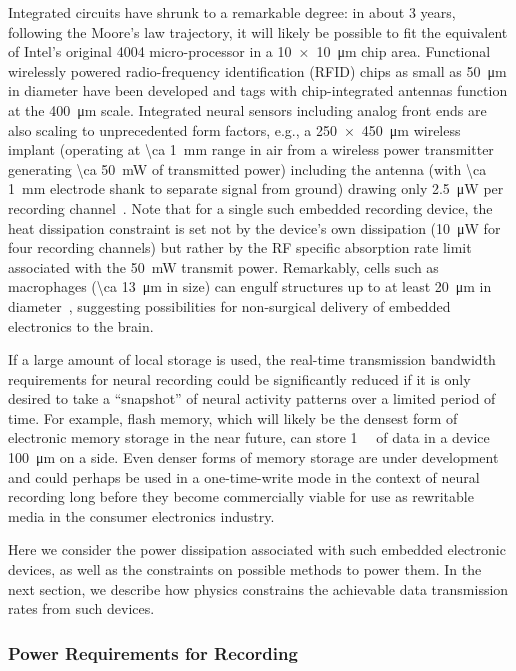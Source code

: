 Integrated circuits have shrunk to a remarkable degree: in about 3 years, following the Moore's law trajectory, it will likely be possible to fit the equivalent of Intel's original 4004 micro-processor in a \SI{10 x 10}{\micro\meter} chip area.
Functional wirelessly powered radio-frequency identification (RFID) chips as small as \SI{50}{\micro\meter} in diameter have been developed and tags with chip-integrated antennas function at the \SI{400}{\micro\meter} scale.
Integrated neural sensors including analog front ends are also scaling to unprecedented form factors, e.g., a \SI{250 x 450}{\micro\meter} wireless implant (operating at \SI{\ca 1}{\milli\meter} range in air from a wireless power transmitter generating \SI{\ca 50}{\milli\watt} of transmitted power) including the antenna (with \SI{\ca 1}{\milli\meter} electrode shank to separate signal from ground) drawing only \SI{2.5}{\micro\watt} per recording channel~\cite{biederman13}.
Note that for a single such embedded recording device, the heat dissipation constraint is set not by the device's own dissipation (\SI{10}{\micro\watt} for four recording channels) but rather by the RF specific absorption rate limit associated with the \SI{50}{\milli\watt} transmit power.
Remarkably, cells such as macrophages (\SI{\ca 13}{\micro\meter} in size) can engulf structures up to at least \SI{20}{\micro\meter} in diameter~\cite{cannon92}, suggesting possibilities for non-surgical delivery of embedded electronics to the brain.

If a large amount of local storage is used, the real-time transmission bandwidth requirements for neural recording could be significantly reduced if it is only desired to take a ``snapshot'' of neural activity patterns over a limited period of time.
For example, flash memory, which will likely be the densest form of electronic memory storage in the near future, can store \SI{1}{\mega\bit} of data in a device \SI{100}{\micro\meter} on a side.
Even denser forms of memory storage are under development and could perhaps be used in a one-time-write mode in the context of neural recording long before they become commercially viable for use as rewritable media in the consumer electronics industry.

Here we consider the power dissipation associated with such embedded electronic devices, as well as the constraints on possible methods to power them.
In the next section, we describe how physics constrains the achievable data transmission rates from such devices.

\subsubsection{Power Requirements for Recording}

